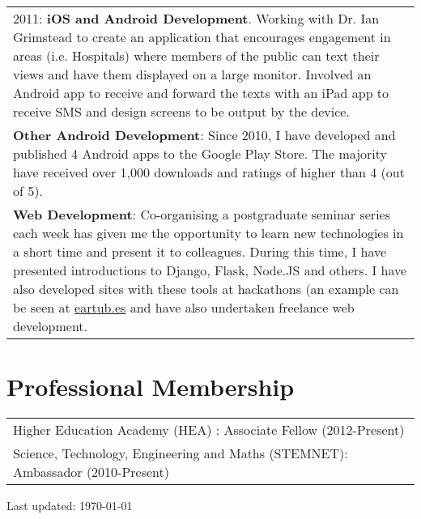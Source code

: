 \documentclass[11pt,fullpage]{article}
\begin{document}
\begin{tabular}{>{\everypar{\hangindent0.5in}}p{6in}}
	2011: \textbf{iOS and Android Development}. Working with Dr. Ian Grimstead to create an application that encourages engagement in areas (i.e. Hospitals) where members of the public 		can text their views and have them displayed on a large monitor. Involved an Android app to receive and forward the texts with an iPad app to receive SMS and design screens to be 			output by the device. \\
	\textbf{Other Android Development}: Since 2010, I have developed and published 4 Android apps to the Google Play Store. The majority have received over 1,000 downloads and ratings of higher than 	4 (out of 5). \\
	\textbf{Web Development}: Co-organising a postgraduate seminar series each week has given me the opportunity to learn new technologies in a short time and present it to colleagues. During this 	time, I have presented introductions to Django, Flask, Node.JS and others. I have also developed sites with these tools at hackathons (an example can be seen at 						    \href{http://eartub.es}{eartub.es} and have also undertaken freelance web development.
\end{tabular}

\section*{Professional Membership}

\begin{tabular}{>{\everypar{\hangindent0.5in}}p{6in}}
	Higher Education Academy (HEA) : Associate Fellow (2012-Present) \\
	Science, Technology, Engineering and Maths (STEMNET): Ambassador (2010-Present)
\end{tabular}
\bigskip
\begin{center}
  \begin{footnotesize}
    Last updated: \today
  \end{footnotesize}
\end{center}

\end{document}
